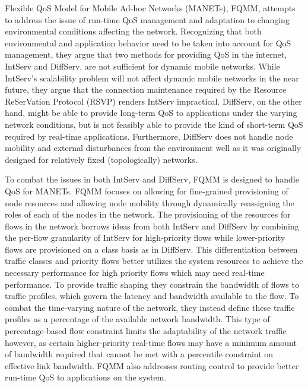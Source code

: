 Flexible QoS Model for Mobile Ad-hoc Networks (MANETs),
FQMM\cite{Xiao2000}, attempts to address the issue of run-time QoS
management and adaptation to changing environmental conditions
affecting the network.  Recognizing that both environmental and
application behavior need to be taken into account for QoS management,
they argue that two methods for providing QoS in the internet,
IntServ\cite{Braden1994} and DiffServ\cite{Blake1998}, are not
sufficient for dynamic mobile networks.  While IntServ's scalability
problem will not affect dynamic mobile networks in the near future,
they argue that the connection maintenance required by the Resource
ReSerVation Protocol (RSVP) renders IntServ impractical.  DiffServ, on
the other hand, might be able to provide long-term QoS to applications
under the varying network conditions, but is not feasibly able to
provide the kind of short-term QoS required by real-time applications.
Furthermore, DiffServ does not handle node mobility and external
disturbances from the environment well as it was originally designed
for relatively fixed (topologically) networks.

To combat the issues in both IntServ and DiffServ, FQMM is designed to
handle QoS for MANETs.  FQMM focuses on allowing for fine-grained
provisioning of node resources and allowing node mobility through
dynamically reassigning the roles of each of the nodes in the network.
The provisioning of the resources for flows in the network borrows
ideas from both IntServ and DiffServ by combining the per-flow
granularity of IntServ for high-priority flows while lower-priority
flows are provisioned on a class basis as in DiffServ.  This
differentiation between traffic classes and priority flows better
utilizes the system resources to achieve the necessary performance for
high priority flows which may need real-time performance.  To provide
traffic shaping they constrain the bandwidth of flows to traffic
profiles, which govern the latency and bandwidth available to the
flow. To combat the time-varying nature of the network, they instead
define these traffic profiles as a percentage of the available network
bandwidth.  This type of percentage-based flow constraint limits the
adaptability of the network traffic however, as certain
higher-priority real-time flows may have a minimum amount of bandwidth
required that cannot be met with a percentile constraint on effective
link bandwidth.  FQMM also addresses routing control to provide better
run-time QoS to applications on the system.

